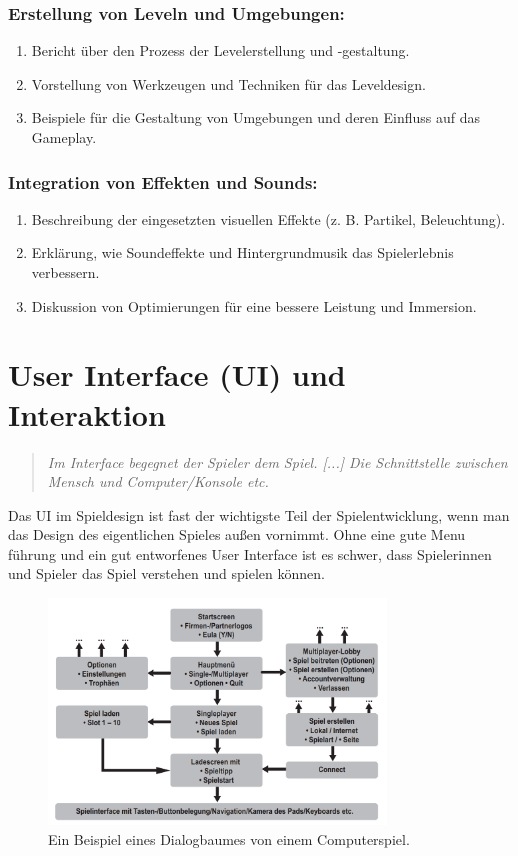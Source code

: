 \subsection{Erstellung von Leveln und Umgebungen:}
\begin{enumerate}
  \item Bericht über den Prozess der Levelerstellung und -gestaltung.
  \item Vorstellung von Werkzeugen und Techniken für das Leveldesign.
  \item Beispiele für die Gestaltung von Umgebungen und deren Einfluss auf das Gameplay.
\end{enumerate}

\subsection{Integration von Effekten und Sounds:}
\begin{enumerate}
  \item Beschreibung der eingesetzten visuellen Effekte (z. B. Partikel, Beleuchtung).
  \item Erklärung, wie Soundeffekte und Hintergrundmusik das Spielerlebnis verbessern.
  \item Diskussion von Optimierungen für eine bessere Leistung und Immersion.
\end{enumerate}

\chapter{User Interface (UI) und Interaktion}

\begin{quote}
\emph{\glqq Im Interface begegnet der Spieler dem Spiel. [...] Die Schnittstelle zwischen Mensch und Computer/Konsole etc.\grqq}~\cite[p.~161]{GameDesign} \\
\end{quote}

Das UI im Spieldesign ist fast der wichtigste Teil der Spielentwicklung, wenn man das Design des eigentlichen Spieles außen vornimmt. 
Ohne eine gute Menu führung und ein gut entworfenes User Interface ist es schwer, dass Spielerinnen und Spieler das Spiel verstehen und spielen können. 

\begin{figure}[H]
  \centering
  \includegraphics[width=0.8\textwidth]{chapters/03/images/Spielinterface.png}
  \caption{Ein Beispiel eines Dialogbaumes von einem Computerspiel.}
  \label{htl01}
\end{figure}

